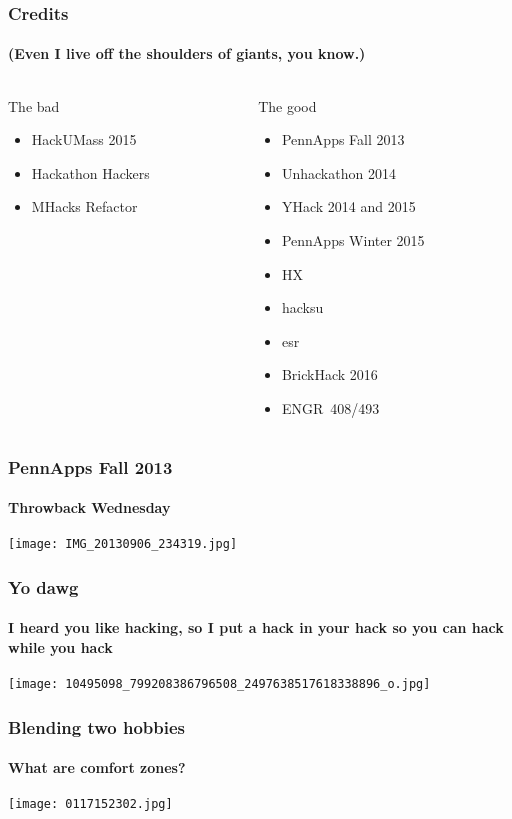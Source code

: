 \documentclass{beamer}
\begin{document}
\begin{frame}
\frametitle{Credits}
\framesubtitle{(Even I live off the shoulders of giants, you know.)}
\begin{columns}[T]
\begin{column}{0.5\textwidth}{The bad}
\pause
\begin{itemize}
\item HackUMass 2015
\item Hackathon Hackers
\item MHacks Refactor
\end{itemize}
\end{column}
\pause
\begin{column}{0.5\textwidth}{The good}
\pause
\begin{itemize}
\item PennApps Fall 2013
\item Unhackathon 2014
\item YHack 2014 and 2015
\item PennApps Winter 2015
\item HX
\item hacksu
\item esr
\item BrickHack 2016
\item ENGR~408/493
\end{itemize}
\end{column}
\end{columns}
\end{frame}

\begin{frame}
\frametitle{PennApps Fall 2013}
\framesubtitle{Throwback Wednesday}
\begin{center}
\texttt{[image: IMG\_20130906\_234319.jpg]}
\end{center}
\end{frame}

\begin{frame}
\frametitle{Yo dawg}
\framesubtitle{I heard you like hacking, so I put a hack in your hack so you can hack while you hack}
\begin{center}
\texttt{[image: 10495098\_799208386796508\_2497638517618338896\_o.jpg]}
\end{center}
\end{frame}

\begin{frame}
\frametitle{Blending two hobbies}
\framesubtitle{What are comfort zones?}
\begin{center}
\texttt{[image: 0117152302.jpg]}
\end{center}
\end{frame}
\end{document}

